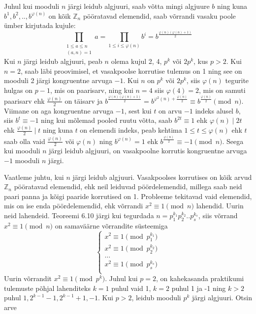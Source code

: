 \documentclass[a4paper, 10pt]{article}
\newcommand{\Z}{\mathbb{Z}}
\begin{document}
\bigskip
Juhul kui mooduli $n$ järgi leidub algjuuri, saab võtta mingi algjuure $b$ ning kuna $b^1, b^2,.., b^{\varphi(n)}$ on kõik $\Z_n$ pööratavad elemendid, saab võrrandi vasaku poole ümber kirjutada kujule: $$\prod\limits_{\substack{1\leq a \leq n\\(a,n)=1}}a=\prod\limits_{1\leq i \leq \varphi(n)}b^i=b^{\frac{\varphi(n)(\varphi(n)+1)}{2}}$$ Kui $n$ järgi leidub algjuuri, peab $n$ olema kujul 2, 4, $p^k$ või $2p^k$, kus $p>2$. Kui $n=2$, saab läbi proovimisel, et vasakpoolse korrutise tulemus on 1 ning see on mooduli 2 järgi kongruentne arvuga $-1$. Kui $n$ on $p^k$ või $2p^k$, siis $\varphi(n)$ tegurite hulgas on $p-1$, mis on paarisarv, ning kui $n=4$ siis $\varphi(4)=2$, mis on samuti paarisarv ehk $\frac{\varphi(n)}2$ on täisarv ja $b^{\frac{\varphi(n)(\varphi(n)+1)}{2}}=b^{\varphi^2(n)+\frac{\varphi(n)}{2}}\equiv b^{\frac{\varphi(n)}{2}}\pmod n$. Viimane on aga kongruentne arvuga $-1$, sest kui $t$ on arvu $-1$ indeks alusel $b$, siis $b^t\equiv-1$ ning kui mõlemad pooled ruutu võtta, saab $b^{2t}\equiv1$ ehk $\varphi(n)\mid2t$ ehk $\frac{\varphi(n)}{2}\mid t$ ning kuna $t$ on elemendi indeks, peab kehtima $1\leq t\leq\varphi(n)$ ehk $t$ saab olla vaid $\frac{\varphi(n)}{2}$ või $\varphi(n)$ ning $b^{\varphi(n)}=1$ ehk $b^{\frac{\varphi(n)}{2}}\equiv-1\pmod n$. Seega kui mooduli $n$ järgi leidub algjuuri, on vasakpoolne korrutis kongruentne arvuga $-1$ mooduli $n$ järgi.

Vaatleme juhtu, kui $n$ järgi leidub algjuuri. Vasakpoolses korrutises on kõik arvud $\Z_n$ pööratavad elemendid, ehk neil leiduvad pöördelemendid, millega saab neid paari panna ja kõigi paaride korrutised on 1. Probleeme tekitavad vaid elemendid, mis on ise enda pöördelemendid, ehk võrrandi $x^2\equiv1\pmod n$ lahendid. Uurin neid lahendeid. Teoreemi 6.10 järgi kui tegurdada $n=p_1^{k_1}p_2^{k_2}..p_s^{k_s}$, siis võrrand $x^2\equiv1\pmod n$ on samaväärne võrrandite süsteemiga
$$\begin{cases}x^2\equiv1\pmod{p_1^{k_1}}\\x^2\equiv1\pmod{p_2^{k_2}}\\\dots\\x^2\equiv1\pmod{p_s^{k_s}}\\\end{cases}$$
Uurin võrrandit $x^2\equiv1\pmod {p^k}$. Juhul kui $p=2$, on kahekasanda praktikumi tulemuste põhjal lahenditeks $k=1$ puhul vaid 1, $k=2$ puhul 1 ja -1 ning $k>2$ puhul $1, 2^{k-1}-1, 2^{k-1}+1,-1$. Kui $p>2$, leidub mooduli $p^k$ järgi algjuuri. Otsin arve
\end{document}
